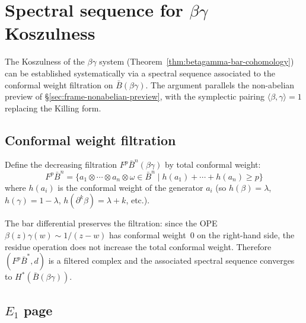 \section{Spectral sequence for \texorpdfstring{$\beta\gamma$}{beta-gamma}
Koszulness}
\label{sec:betagamma-spectral-sequence}

The Koszulness of the $\beta\gamma$ system
(Theorem~\ref{thm:betagamma-bar-cohomology}) can be established
systematically via a spectral sequence associated to the conformal
weight filtration on $\bar{B}(\beta\gamma)$.  The argument parallels
the non-abelian preview of \S\ref{sec:frame-nonabelian-preview}, with
the symplectic pairing $\langle \beta, \gamma \rangle = 1$ replacing
the Killing form.

\subsection{Conformal weight filtration}

\begin{definition}
\label{def:conformal-weight-filtration}
Define the decreasing filtration $F^p \bar{B}^n(\beta\gamma)$ by
total conformal weight:
\begin{equation}\label{eq:conf-weight-filtration}
F^p \bar{B}^n = \bigl\{
a_1 \otimes \cdots \otimes a_n \otimes \omega \in \bar{B}^n
\;\big|\;
h(a_1) + \cdots + h(a_n) \geq p \bigr\}
\end{equation}
where $h(a_i)$ is the conformal weight of the generator $a_i$
(so $h(\beta) = \lambda$, $h(\gamma) = 1-\lambda$,
$h(\partial^k \beta) = \lambda + k$, etc.).
\end{definition}

The bar differential preserves the filtration: since the OPE
$\beta(z)\gamma(w) \sim 1/(z-w)$ has conformal weight~$0$ on the
right-hand side, the residue operation does not increase the total
conformal weight.  Therefore $(F^p \bar{B}^*, d)$ is a filtered
complex and the associated spectral sequence converges to
$H^*(\bar{B}(\beta\gamma))$.

\subsection{\texorpdfstring{$E_1$}{E1} page}

